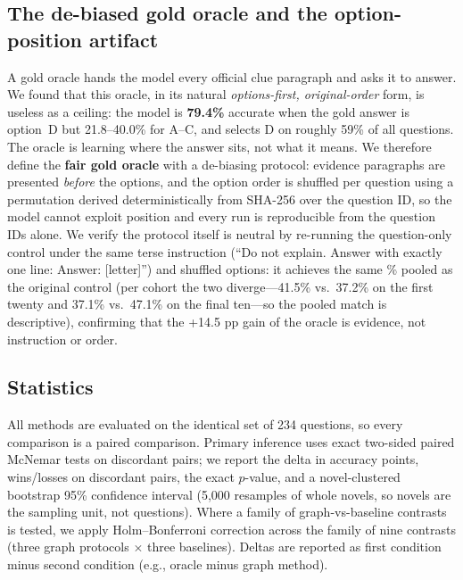 \documentclass{article}
\newcommand{\pp}{\ensuremath{\,\mathrm{pp}}}
\begin{document}
\subsection{The de-biased gold oracle and the option-position artifact}
\label{sec:fairgold}

A gold oracle hands the model every official clue paragraph
\citep{xu2024detectiveqa} and asks it to answer. We found that this oracle, in
its natural \emph{options-first, original-order} form, is useless as a ceiling:
the model is \textbf{79.4\%} accurate when the gold answer is option~D but
21.8--40.0\% for A--C, and selects D on roughly 59\% of all questions. The
oracle is learning where the answer sits, not what it means. We therefore define
the \textbf{fair gold oracle} with a de-biasing protocol: evidence paragraphs are
presented \emph{before} the options, and the option order is shuffled per
question using a permutation derived deterministically from SHA-256 over the
question ID, so the model cannot exploit position and every run is reproducible
from the question IDs alone. We verify the protocol itself is neutral by
re-running the question-only control under the same terse instruction
(``Do not explain. Answer with exactly one line: Answer: [letter]'') and
shuffled options: it achieves the same \QZeroAcc\% pooled as the original
control (per cohort the two diverge---41.5\% vs.\ 37.2\% on the first twenty
and 37.1\% vs.\ 47.1\% on the final ten---so the pooled match is descriptive),
confirming that the +14.5\,\pp{} gain of the oracle is evidence, not instruction
or order.

\subsection{Statistics}
\label{sec:stats-method}

All methods are evaluated on the identical set of 234 questions, so every
comparison is a paired comparison. Primary inference uses exact two-sided
paired McNemar tests on discordant pairs; we report the delta in accuracy
points, wins/losses on discordant pairs, the exact $p$-value, and a
novel-clustered bootstrap 95\% confidence interval (5,000 resamples of whole
novels, so novels are the sampling unit, not questions). Where a family of
graph-vs-baseline contrasts is tested, we apply Holm--Bonferroni correction
across the family of nine contrasts (three graph protocols $\times$ three
baselines). Deltas are reported as first condition minus second condition (e.g.,
oracle minus graph method).
\end{document}
